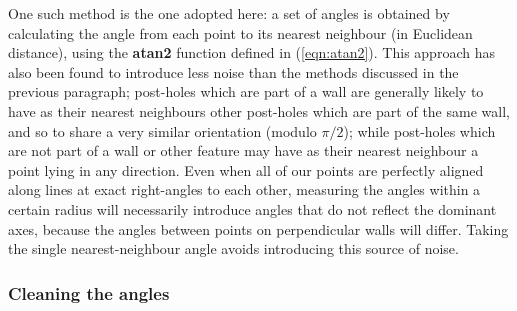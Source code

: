 \documentclass[../../ArchStats.tex]{subfiles}
\begin{document}
One such method is the one adopted here: a set of angles is obtained by calculating the angle from each point to its nearest neighbour (in Euclidean distance), using the \textbf{atan2} function defined in (\ref{eqn:atan2}). This approach has also been found to introduce less noise than the methods discussed in the previous paragraph; post-holes which are part of a wall are generally likely to have as their nearest neighbours other post-holes which are part of the same wall, and so to share a very similar orientation (modulo $\pi/2$); while post-holes which are not part of a wall or other feature may have as their nearest neighbour a point lying in any direction. Even when all of our points are perfectly aligned along lines at exact right-angles to each other, measuring the angles within a certain radius will necessarily introduce angles that do not reflect the dominant axes, because the angles between points on perpendicular walls will differ. Taking the single nearest-neighbour angle avoids introducing this source of noise. 

\subsubsection{Cleaning the angles}


\end{document}
